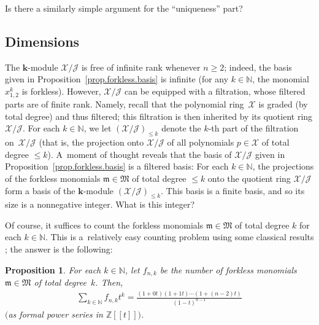 \documentclass[pdftex]{sigma}
\newtheorem{Proposition}[Theorem]{Proposition}
\numberwithin{equation}{section}
\let\sumnonlimits\sum
\renewcommand{\sum}{\sumnonlimits\limits}
\begin{document}
\begin{question}Is there a similarly simple argument for the ``uniqueness'' part?
\end{question}

\subsection{Dimensions}

The $\mathbf{k}$-module $\mathcal{X}/\mathcal{J}$ is free of infinite rank whenever $n\geq2$; indeed, the basis given in Proposition~\ref{prop.forkless.basis} is infinite (for any $k\in\mathbb{N}$, the monomial $x_{1,2}^{k}$ is forkless). However, $\mathcal{X}/\mathcal{J}$ can be equipped with a filtration, whose filtered parts are of finite rank. Namely, recall that the polynomial ring~$\mathcal{X}$ is graded (by total degree) and thus filtered; this filtration is then inherited by its quotient ring $\mathcal{X}/\mathcal{J}$. For each $k\in\mathbb{N}$, we let $(\mathcal{X}/\mathcal{J}) _{\leq k}$ denote the $k$-th part of the filtration on~$\mathcal{X}/\mathcal{J}$ (that is, the projection onto $\mathcal{X}/\mathcal{J}$ of all polynomials $p\in\mathcal{X}$ of total degree $\leq k$). A~moment of thought reveals that the basis of $\mathcal{X}/\mathcal{J}$ given in Proposition~\ref{prop.forkless.basis} is a filtered basis: For each $k\in\mathbb{N}$, the projections of the forkless monomials $\mathfrak{m}\in\mathfrak{M}$ of total degree $\leq k$ onto the quotient ring
$\mathcal{X}/\mathcal{J}$ form a basis of the $\mathbf{k}$-module $( \mathcal{X}/\mathcal{J})_{\leq k}$. This basis is a finite basis, and so its size is a nonnegative integer. What is this integer?

Of course, it suffices to count the forkless monomials $\mathfrak{m}\in\mathfrak{M}$ of total degree $k$ for each $k\in\mathbb{N}$. This is a~relatively easy counting problem using some classical results \cite[Propositions~1.3.7 and~1.3.10]{Stanley-EC1}; the answer is
the following:

\begin{Proposition}\label{prop.forkless.count}For each $k\in\mathbb{N}$, let $f_{n,k}$ be the number of forkless monomials $\mathfrak{m}\in\mathfrak{M}$ of total degree~$k$. Then,
\begin{gather*}
\sum_{k\in\mathbb{N}}f_{n,k}t^{k}=\frac{ ( 1+0t ) (1+1t ) \cdots ( 1+(n-2) t ) }{(1-t) ^{n-1}}
\end{gather*}
$($as formal power series in $\mathbb{Z}[[t]])$.
\end{Proposition}
\end{document}
